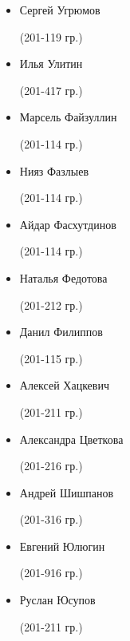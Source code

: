 \begin{multicols}{2}
\begin{small}
\begin{itemize}[leftmargin=0.5em]
	\item[] Сергей Угрюмов\begin{tiny} (201-119 гр.)\end{tiny}
	\item[] Илья Улитин\begin{tiny} (201-417 гр.)\end{tiny}

	\item[] Марсель Файзуллин\begin{tiny} (201-114 гр.)\end{tiny}
	\item[] Нияз Фазлыев\begin{tiny} (201-114 гр.)\end{tiny} %
	\item[] Айдар Фасхутдинов\begin{tiny} (201-114 гр.)\end{tiny} %
	\item[] Наталья Федотова\begin{tiny} (201-212 гр.)\end{tiny}
	\item[] Данил Филиппов\begin{tiny} (201-115 гр.)\end{tiny}

	\item[] Алексей Хацкевич\begin{tiny} (201-211 гр.)\end{tiny}

	\item[] Александра Цветкова\begin{tiny} (201-216 гр.)\end{tiny}

	\item[] Андрей Шишпанов\begin{tiny} (201-316 гр.)\end{tiny} %

	\item[] Евгений Юлюгин\begin{tiny} (201-916 гр.)\end{tiny}
	\item[] Руслан Юсупов\begin{tiny} (201-211 гр.)\end{tiny}
\end{itemize}
\end{small}
\end{multicols}